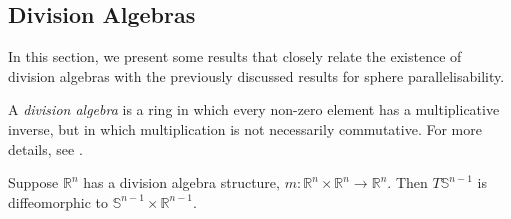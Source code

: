 \subsection{Division Algebras}
In this section, we present some results that closely relate the existence of division algebras with the previously discussed results for sphere parallelisability.
\begin{definition}
A \textit{division algebra} is a ring in which every non-zero element has a multiplicative inverse, but in which multiplication is not necessarily commutative. For more details, see \cite{MR1415833}.
\end{definition}
\begin{theorem}
Suppose $\mathbb{R}^n$ has a division algebra structure, $m:\mathbb{R}^n\times\mathbb{R}^n\to\mathbb{R}^n$. Then $T\mathbb{S}^{n-1}$ is diffeomorphic to $\mathbb{S}^{n-1}\times\mathbb{R}^{n-1}$.
\end{theorem}
